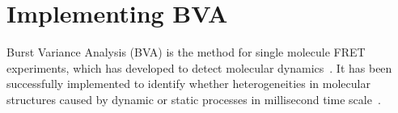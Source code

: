 \section{Implementing BVA}


Burst Variance Analysis (BVA) is the method for single molecule FRET experiments, which has developed to detect molecular dynamics~\cite{Torella_2011}. It has been successfully implemented to identify whether heterogeneities in molecular structures caused by dynamic or static processes in millisecond time scale~\cite{Torella_2011}\cite{Robb_2013}.